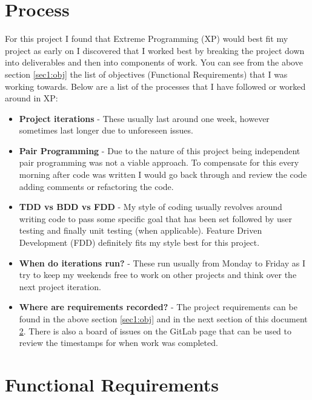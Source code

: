 \section{Process}\label{sec1:pro}
For this project I found that Extreme Programming (XP) would best fit my project as early on I discovered that I worked best by breaking the project down into deliverables and then into components of work. You can see from the above section \ref{sec1:obj} the list of objectives (Functional Requirements) that I was working towards. Below are a list of the processes that I have followed or worked around in XP:
\begin{itemize}
	\item \textbf{Project iterations} - These usually last around one week, however sometimes last longer due to unforeseen issues.
	\item \textbf{Pair Programming} - Due to the nature of this project being independent pair programming was not a viable approach. To compensate for this every morning after code was written I would go back through and review the code adding comments or refactoring the code.
	\item \textbf{TDD vs BDD vs FDD} - My style of coding usually revolves around writing code to pass some specific goal that has been set followed by user testing and finally unit testing (when applicable). Feature Driven Development (FDD) definitely fits my style best for this project.
	\item \textbf{When do iterations run?} - These run usually from Monday to Friday as I try to keep my weekends free to work on other projects and think over the next project iteration.
	\item \textbf{Where are requirements recorded?} - The project requirements can be found in the above section \ref{sec1:obj} and in the next section of this document \ref{sec1:fr}. There is also a board of issues on the GitLab page that can be used to review the timestamps for when work was completed.
\end{itemize}

\section{Functional Requirements}\label{sec1:fr}

